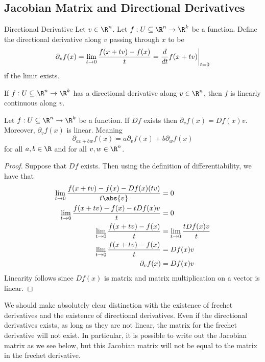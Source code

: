 \documentclass[a4paper]{article}
\begin{document}
\subsection{Jacobian Matrix and Directional Derivatives}
\begin{defn}{Directional Derivative}{} Let $v\in\R^n$. Let $f:U\subseteq\R^n\to\R^k$ be a function. Define the directional derivative along $v$ passing through $x$ to be $$\partial_vf(x)=\lim_{t\to 0}\frac{f(x+tv)-f(x)}{t}=\frac{d}{dt}f(x+tv)\bigg{|}_{t=0}$$ if the limit exists. 
\end{defn}

\begin{prp} If $f:U\subseteq\R^n\to\R^k$ has a directional derivative along $v\in\R^n$, then $f$ is linearly continuous along $v$. 
\end{prp}

\begin{prp}{}{} Let $f:U\subseteq\R^n\to\R^k$ be a function. If $Df$ exists then $\partial_vf(x)=Df(x)v$. Moreover, $\partial_vf(x)$ is linear. Meaning $$\partial_{av+bw}f(x)=a\partial_vf(x)+b\partial_wf(x)$$ for all $a,b\in\R$ and for all $v,w\in\R^n$. \tcbline
\begin{proof}
Suppose that $Df$ exists. Then using the definition of differentiability, we have that 
\begin{align*}
\lim_{t\to 0}\frac{f(x+tv)-f(x)-Df(x)(tv)}{t\abs{v}}&=0\\
\lim_{t\to 0}\frac{f(x+tv)-f(x)-tDf(x)v}{t}&=0\\
\lim_{t\to 0}\frac{f(x+tv)-f(x)}{t}&=\lim_{t\to 0}\frac{tDf(x)v}{t}\\
\lim_{t\to 0}\frac{f(x+tv)-f(x)}{t}&=Df(x)v\\
\partial_vf(x)&=Df(x)v
\end{align*}
Linearity follows since $Df(x)$ is matrix and matrix multiplication on a vector is linear. 
\end{proof}
\end{prp}

We should make absolutely clear distinction with the existence of frechet derivatives and the existence of directional derivatives. Even if the directional derivatives exists, as long as they are not linear, the matrix for the frechet derivative will not exist. In particular, it is possible to write out the Jacobian matrix as we see below, but this Jacobian matrix will not be equal to the matrix in the frechet derivative. \\~\\
\end{document}

